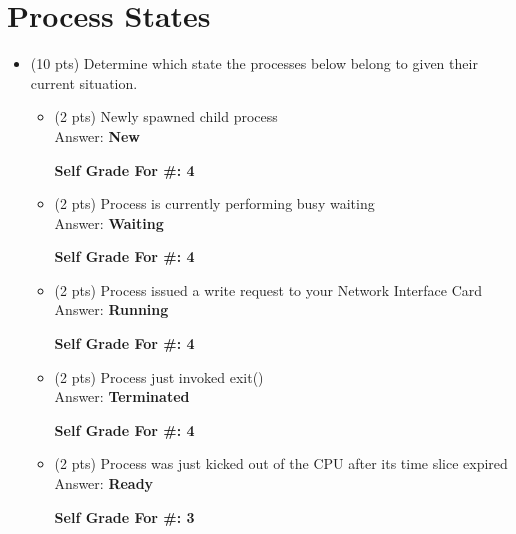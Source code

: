 \documentclass[conference]{IEEEtran}
\begin{document}
\section{Process States}
\begin{itemize}
	\item (10 pts) Determine which state the processes below belong to given their current
	situation.
	\begin{itemize} 
		\item (2 pts) Newly spawned child process \\
		Answer: \textbf{New}
		\begin{center}
			\textbf{Self Grade For \#: 4}
		\end{center}
	 
		\item (2 pts) Process is currently performing busy waiting \\
		Answer: \textbf{Waiting}
		\begin{center}
			\textbf{Self Grade For \#: 4}
		\end{center}
	
		\item (2 pts) Process issued a write request to your Network Interface Card \\
		Answer: \textbf{Running}
		\begin{center}
			\textbf{Self Grade For \#: 4}
		\end{center}
	
		\item (2 pts) Process just invoked exit() \\
		Answer: \textbf{Terminated}
		\begin{center}
		\textbf{Self Grade For \#: 4}
		\end{center}
	
		\item (2 pts) Process was just kicked out of the CPU after its time slice expired \\
		Answer: \textbf{Ready}
		\begin{center}
		\textbf{Self Grade For \#: 3}
		\end{center}
		
	\end{itemize}
\end{itemize}
\nocite{*}
\printbibliography
\end{document}
